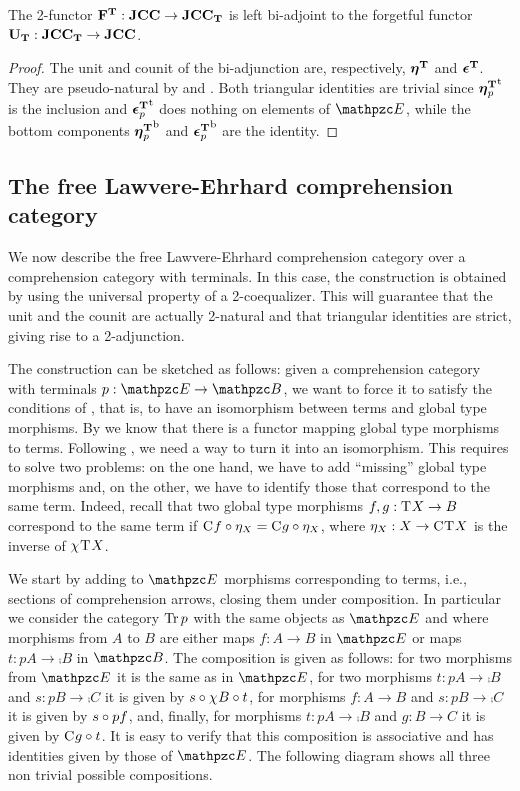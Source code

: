 \documentclass{lmcs} %
\theoremstyle{plain}\newtheorem{satz}[thm]{Satz} %
\begin{document}
			\begin{thm}
				The 2-functor $\mathbf{F^T}:\mathbf{JCC}\to\mathbf{JCC_T}$ is left bi-adjoint to the forgetful functor $\mathbf{U_T}:\mathbf{JCC_T}\to\mathbf{JCC}$.
			\end{thm}
			
			\begin{proof}
				The unit and counit of the bi-adjunction are, respectively, $\boldsymbol{\eta}^{\mathbf{T}}_{}$ and $\boldsymbol{\epsilon}^{\mathbf{T}}_{}$. They are pseudo-natural by  and . Both triangular identities are trivial since ${\boldsymbol{\eta}^{\mathbf{T}}_{p}}^{\mathrm{t}}$ is the inclusion and ${\boldsymbol{\epsilon}^{\mathbf{T}}_{p}}^{\mathrm{t}}$ does nothing on elements of $\ct{E}$, while the bottom components ${\boldsymbol{\eta}^{\mathbf{T}}_{p}}^{\mathrm{b}}$ and ${\boldsymbol{\epsilon}^{\mathbf{T}}_{p}}^{\mathrm{b}}$ are the identity.
			\end{proof}

			\subsection{The free Lawvere-Ehrhard comprehension category}
			
			
We now describe the free Lawvere-Ehrhard comprehension category over a comprehension category with terminals. In this case, the construction is obtained by using the universal property of a 2-coequalizer. This will guarantee that the unit and the counit are actually 2-natural and that triangular identities are strict, giving rise to a 2-adjunction.

The construction can be sketched as follows: given a comprehension category with terminals $p:\ct{E}\to\ct{B}$, we want to force it to satisfy the conditions of , that is, to have an isomorphism between terms and global type morphisms.
%
By  
we know that there is a functor mapping global type morphisms to terms. 
Following , we need a way to turn it into an isomorphism.
This requires to solve two problems: 
on the one hand, we have to add ``missing'' global type morphisms and, on the other, 
we have to identify those that correspond to the same term. 
Indeed, recall that two global type morphisms $f,g : \mathrm{T}^{}X \to B$ correspond to the same term if 
$\mathrm{C}^{}f\circ \eta_X = \mathrm{C}^{}g\circ \eta_X$, where $\eta_X : X \to \mathrm{C}^{}\mathrm{T}^{}X$ is the inverse of $\chi^{}\mathrm{T}^{}X$.

We start by adding to $\ct{E}$ morphisms corresponding to terms, i.e., sections of comprehension arrows, closing them under composition. In particular we consider the category $\mathop{\mathrm{Tr}}\nolimits{p}$ 
with the same objects as $\ct{E}$ and where morphisms from $A$ to $B$ 
are either maps $f:A\to B$ in $\ct{E}$ or maps $t:pA\to \comp{}B$ in $\ct{B}$. 
The composition is given as follows: 
for two morphisms from $\ct{E}$ it is the same as in $\ct{E}$, 
for two morphisms $t : pA\to\comp{}B$ and $s : pB\to\comp{}C$ it  is given by $s\circ\chi^{}B\circ t$, 
for morphisms $f:A\to B$ and $s:pB\to \comp{}C$ it is given by $s\circ pf$, and, finally, 
for morphisms $t:pA\to \comp{}B$ and $g:B\to C$ it is given by $\mathrm{C}^{}g\circ t$.
It is easy to verify that this composition  is associative and has identities given by those of $\ct{E}$. The following diagram shows all three non trivial possible compositions.
\end{document}
